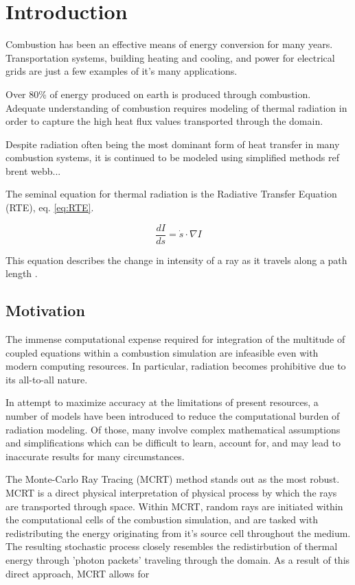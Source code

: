 \addchapheadtotoc

\chapter{Introduction}
Combustion has been an effective means of energy conversion for many years. Transportation systems, building heating and cooling, and power for electrical grids are just a few examples of it's many applications. 

Over 80\% of energy produced on earth is produced through combustion. Adequate understanding of combustion requires modeling of thermal radiation in order to capture the high heat flux values transported through the domain.

Despite radiation often being the most dominant form of heat transfer in many combustion systems, it is continued to be modeled using simplified methods ref brent webb...

The seminal equation for thermal radiation is the Radiative Transfer Equation (RTE), eq. \ref{eq:RTE}.

\begin{equation}
    \frac{dI}{ds} = \dot{s} \cdot \nabla{I}
    \label{eq:RTE}
\end{equation}

This equation describes the change in intensity of a ray as it travels along a path length \cite{Modest2013RadiativeTransfer}.

\section{Motivation}
The immense computational expense required for integration of the multitude of coupled equations within a combustion simulation are infeasible even with modern computing resources. In particular, radiation becomes prohibitive due to its all-to-all nature. 

In attempt to maximize accuracy at the limitations of present resources, a number of models have been introduced to reduce the computational burden of radiation modeling. 
Of those, many involve complex mathematical assumptions and simplifications which can be difficult to learn, account for, and may lead to inaccurate results for many circumstances. 


The Monte-Carlo Ray Tracing (MCRT) method stands out as the most robust. 
MCRT is a direct physical interpretation of physical process by which the rays are transported through space.
Within MCRT, random rays are initiated within the computational cells of the combustion simulation, and are tasked with redistributing the energy originating from it's source cell throughout the medium. The resulting stochastic process closely resembles the redistirbution of thermal energy through 'photon packets' traveling through the domain.
As a result of this direct approach, MCRT allows for 

